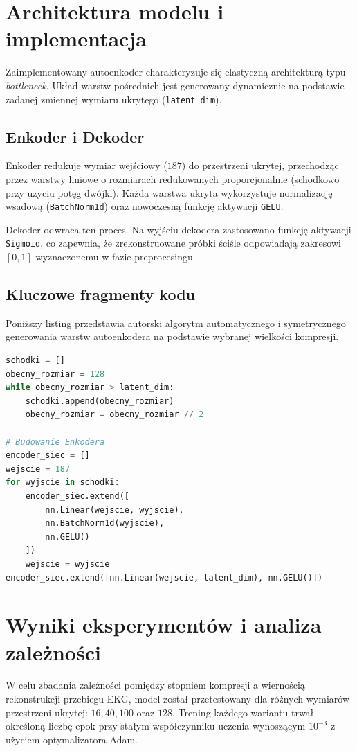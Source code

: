 \documentclass[12pt,a4paper]{article}
\begin{document}
\section{Architektura modelu i implementacja}
Zaimplementowany autoenkoder charakteryzuje się elastyczną architekturą typu \textit{bottleneck}. Układ warstw pośrednich jest generowany dynamicznie na podstawie zadanej zmiennej wymiaru ukrytego (\texttt{latent\_dim}).

\subsection{Enkoder i Dekoder}
Enkoder redukuje wymiar wejściowy ($187$) do przestrzeni ukrytej, przechodząc przez warstwy liniowe o rozmiarach redukowanych proporcjonalnie (schodkowo przy użyciu potęg dwójki). Każda warstwa ukryta wykorzystuje normalizację wsadową (\texttt{BatchNorm1d}) oraz nowoczesną funkcję aktywacji \texttt{GELU}.

Dekoder odwraca ten proces. Na wyjściu dekodera zastosowano funkcję aktywacji \texttt{Sigmoid}, co zapewnia, że zrekonstruowane próbki ściśle odpowiadają zakresowi $[0, 1]$ wyznaczonemu w fazie preprocesingu.

\subsection{Kluczowe fragmenty kodu}
Poniższy listing przedstawia autorski algorytm automatycznego i symetrycznego generowania warstw autoenkodera na podstawie wybranej wielkości kompresji.

\begin{lstlisting}[language=Python, caption={Algorytm dynamicznego budowania warstw modelu (training.py)}]
schodki = []
obecny_rozmiar = 128
while obecny_rozmiar > latent_dim:
    schodki.append(obecny_rozmiar)
    obecny_rozmiar = obecny_rozmiar // 2

# Budowanie Enkodera
encoder_siec = []
wejscie = 187
for wyjscie in schodki:
    encoder_siec.extend([
        nn.Linear(wejscie, wyjscie),
        nn.BatchNorm1d(wyjscie),
        nn.GELU()
    ])
    wejscie = wyjscie
encoder_siec.extend([nn.Linear(wejscie, latent_dim), nn.GELU()])
\end{lstlisting}

\section{Wyniki eksperymentów i analiza zależności}
W celu zbadania zależności pomiędzy stopniem kompresji a wiernością rekonstrukcji przebiegu EKG, model został przetestowany dla różnych wymiarów przestrzeni ukrytej: $16, 40, 100$ oraz $128$. Trening każdego wariantu trwał określoną liczbę epok przy stałym współczynniku uczenia wynoszącym $10^{-3}$ z użyciem optymalizatora Adam.
\end{document}
